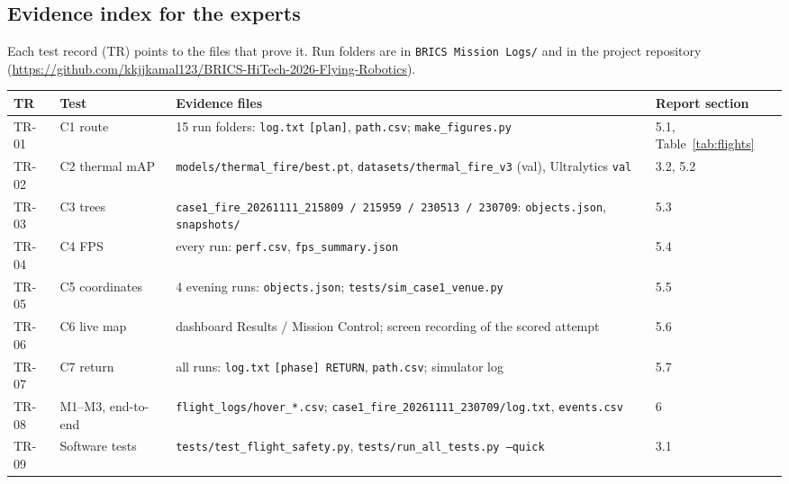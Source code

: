 \documentclass[10pt,a4paper]{article}
\newcommand{\head}[1]{\textbf{#1}}
\newcommand{\file}[1]{\texttt{\small #1}}
\begin{document}
\subsection{Evidence index for the experts}
Each test record (TR) points to the files that prove it. Run folders are in \file{BRICS Mission Logs/} and in the project
repository (\url{https://github.com/kkjjkamal123/BRICS-HiTech-2026-Flying-Robotics}).

\begin{tabularx}{\textwidth}{|L{1.1cm}|L{3.3cm}|Y|L{2.6cm}|}
\hline
{}\head{TR} & \head{Test} & \head{Evidence files} & \head{Report section} \\ \hline
TR-01 & C1 route & 15 run folders: \file{log.txt} \texttt{[plan]}, \file{path.csv}; \file{make\_figures.py} & 5.1, Table~\ref{tab:flights} \\ \hline
TR-02 & C2 thermal mAP & \file{models/thermal\_fire/best.pt}, \file{datasets/thermal\_fire\_v3} (val), Ultralytics \texttt{val} & 3.2, 5.2 \\ \hline
TR-03 & C3 trees & \file{case1\_fire\_20261111\_215809 / 215959 / 230513 / 230709}: \file{objects.json}, \file{snapshots/} & 5.3 \\ \hline
TR-04 & C4 FPS & every run: \file{perf.csv}, \file{fps\_summary.json} & 5.4 \\ \hline
TR-05 & C5 coordinates & 4 evening runs: \file{objects.json}; \file{tests/sim\_case1\_venue.py} & 5.5 \\ \hline
TR-06 & C6 live map & dashboard Results / Mission Control; screen recording of the scored attempt & 5.6 \\ \hline
TR-07 & C7 return & all runs: \file{log.txt} \texttt{[phase] RETURN}, \file{path.csv}; simulator log & 5.7 \\ \hline
TR-08 & M1--M3, end-to-end & \file{flight\_logs/hover\_*.csv}; \file{case1\_fire\_20261111\_230709/log.txt}, \file{events.csv} & 6 \\ \hline
TR-09 & Software tests & \file{tests/test\_flight\_safety.py}, \file{tests/run\_all\_tests.py --quick} & 3.1 \\ \hline
\end{tabularx}
\end{document}
